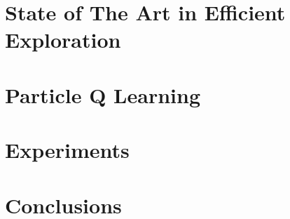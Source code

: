\documentclass[11pt]{report}
\begin{document}
\chapter{State of The Art in Efficient Exploration} \label{chap:chapter3}
 
\chapter{Particle Q Learning} \label{chap:chapter4}
 
\chapter{Experiments}		\label{chap:chapter5}
 
\chapter{Conclusions}		\label{chap:chapter6}


\end{document}
